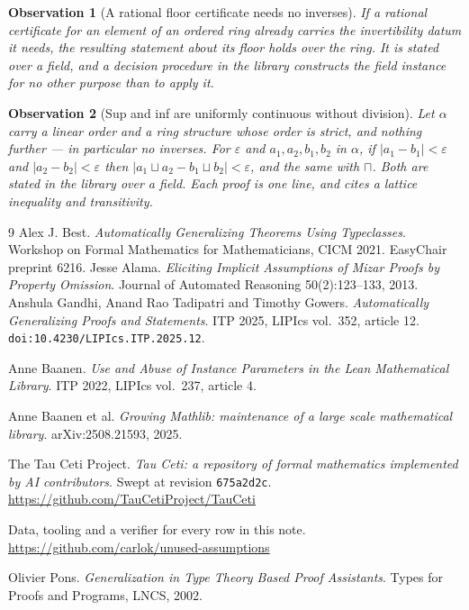 \documentclass[11pt]{article}
\newtheorem{observation}{Observation}
\begin{document}
\begin{observation}[A rational floor certificate needs no inverses]
If a rational certificate for an element of an ordered ring already carries the
invertibility datum it needs, the resulting statement about its floor holds over
the ring. It is stated over a field, and a decision procedure in the library
constructs the field instance for no other purpose than to apply it.
\end{observation}

\begin{observation}[Sup and inf are uniformly continuous without division]
Let $\alpha$ carry a linear order and a ring structure whose order is strict,
and nothing further --- in particular no inverses. For $\varepsilon$ and
$a_1,a_2,b_1,b_2$ in $\alpha$, if $\lvert a_1-b_1\rvert<\varepsilon$ and
$\lvert a_2-b_2\rvert<\varepsilon$ then
$\lvert a_1\sqcup a_2-b_1\sqcup b_2\rvert<\varepsilon$, and the same with
$\sqcap$. Both are stated in the library over a field. Each proof is one line,
and cites a lattice inequality and transitivity.
\end{observation}

\begin{thebibliography}{9}
 Alex J. Best. \emph{Automatically Generalizing Theorems Using
Typeclasses}. Workshop on Formal Mathematics for Mathematicians, CICM 2021.
EasyChair preprint 6216.
 Jesse Alama. \emph{Eliciting Implicit Assumptions of Mizar
Proofs by Property Omission}. Journal of Automated Reasoning 50(2):123--133,
2013.
 Anshula Gandhi, Anand Rao Tadipatri and Timothy Gowers.
\emph{Automatically Generalizing Proofs and Statements}. ITP 2025, LIPIcs
vol.~352, article 12. \texttt{doi:10.4230/LIPIcs.ITP.2025.12}.

 Anne Baanen. \emph{Use and Abuse of Instance Parameters in
the Lean Mathematical Library}. ITP 2022, LIPIcs vol.~237, article 4.

 Anne Baanen et al. \emph{Growing Mathlib: maintenance of a
large scale mathematical library}. arXiv:2508.21593, 2025.

 The Tau Ceti Project. \emph{Tau Ceti: a repository of formal
mathematics implemented by AI contributors}. Swept at revision
\texttt{675a2d2c}. \url{https://github.com/TauCetiProject/TauCeti}

 Data, tooling and a verifier for every row in this note.
\url{https://github.com/carlok/unused-assumptions}

 Olivier Pons. \emph{Generalization in Type Theory Based Proof
Assistants}. Types for Proofs and Programs, LNCS, 2002.
\end{thebibliography}
\end{document}
